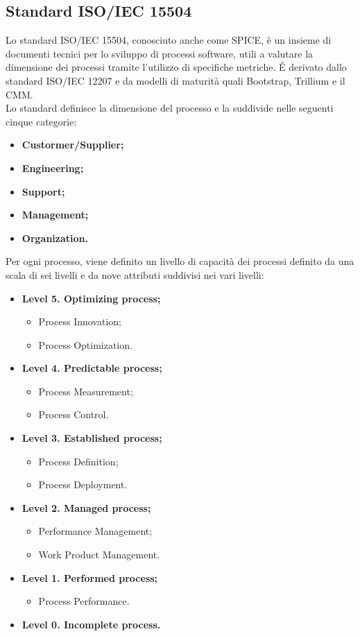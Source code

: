 	\subsection{Standard ISO/IEC 15504}
	Lo standard ISO\gloss{}/IEC\gloss{} 15504, conosciuto anche come SPICE\gloss{}, è un insieme di documenti tecnici per lo sviluppo di processi software, utili a valutare la dimensione dei processi tramite l'utilizzo di specifiche metriche. É derivato dallo standard ISO/IEC 12207 e da modelli di maturità quali Bootstrap, Trillium e il CMM.\\
	Lo standard definisce la dimensione del processo e la suddivide nelle seguenti cinque categorie:
		\begin{itemize}
			\item \textbf{Custormer/Supplier;}
			\item \textbf{Engineering;}
			\item \textbf{Support;}
			\item \textbf{Management;}
			\item \textbf{Organization.}
		\end{itemize}
	Per ogni processo, viene definito un livello di capacità dei processi definito da una scala di sei livelli e da nove attributi suddivisi nei vari livelli:
		\begin{itemize}
			\item \textbf{Level 5. Optimizing process;}
				\begin{itemize}
					\item Process Innovation;
					\item Process Optimization.
				\end{itemize}
			\item \textbf{Level 4. Predictable process;}
				\begin{itemize}
					\item Process Measurement;
					\item Process Control.
				\end{itemize}
			\item \textbf{Level 3. Established process;}
				\begin{itemize}
					\item Process Definition;
					\item Process Deployment.
				\end{itemize}
			\item \textbf{Level 2. Managed process;}
				\begin{itemize}
					\item Performance Management;
					\item Work Product Management.
				\end{itemize}			
			\item \textbf{Level 1. Performed process;}
				\begin{itemize}
					\item Process Performance.
				\end{itemize}
			\item \textbf{Level 0. Incomplete process.}
		\end{itemize}
